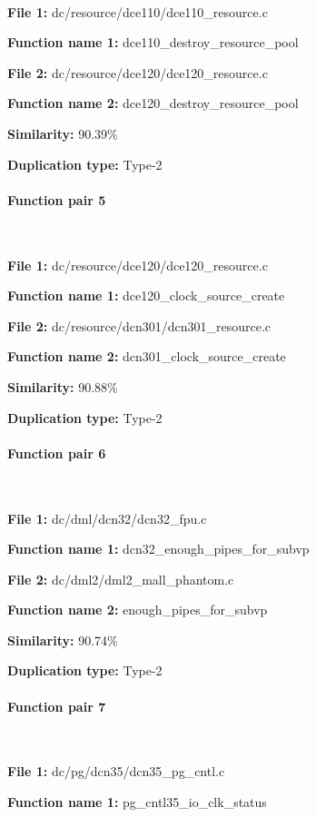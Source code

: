 \

\textbf{File 1:} dc/resource/dce110/dce110\_resource.c

\textbf{Function name 1:} dce110\_destroy\_resource\_pool

\textbf{File 2:} dc/resource/dce120/dce120\_resource.c

\textbf{Function name 2:} dce120\_destroy\_resource\_pool

\textbf{Similarity:} 90.39\%

\textbf{Duplication type:} Type-2


\paragraph{Function pair 5 }  

\

\textbf{File 1:} dc/resource/dce120/dce120\_resource.c

\textbf{Function name 1:} dce120\_clock\_source\_create

\textbf{File 2:} dc/resource/dcn301/dcn301\_resource.c

\textbf{Function name 2:} dcn301\_clock\_source\_create

\textbf{Similarity:} 90.88\%

\textbf{Duplication type:} Type-2


\paragraph{Function pair 6 }  

\

\textbf{File 1:} dc/dml/dcn32/dcn32\_fpu.c

\textbf{Function name 1:} dcn32\_enough\_pipes\_for\_subvp

\textbf{File 2:} dc/dml2/dml2\_mall\_phantom.c

\textbf{Function name 2:} enough\_pipes\_for\_subvp

\textbf{Similarity:} 90.74\%

\textbf{Duplication type:} Type-2


\paragraph{Function pair 7 }  

\

\textbf{File 1:} dc/pg/dcn35/dcn35\_pg\_cntl.c

\textbf{Function name 1:} pg\_cntl35\_io\_clk\_status

